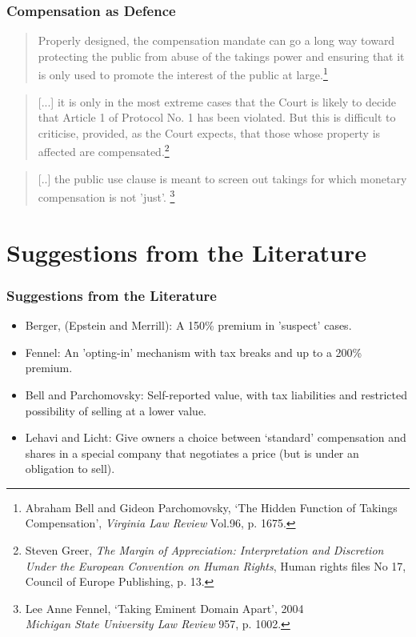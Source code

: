 \documentclass{beamer}
\begin{document}
\begin{frame}
\frametitle{Compensation as Defence}
\begin{center}
\begin{quote}\scriptsize Properly designed, the compensation mandate can go a long way toward protecting the public from abuse of the takings power and ensuring that it is only used to promote the interest of the public at large.\footnote{\tiny Abraham Bell and Gideon Parchomovsky, `The Hidden Function of Takings Compensation', {\it Virginia Law Review} Vol.96, p. 1675.} 
\end{quote}
\end{center}
\begin{center}
\begin{quote}
\scriptsize [...] it is
only in the most extreme cases that the Court is likely to decide that Article 1 of Protocol No. 1 has been violated. But this is difficult to criticise, provided, as the Court expects, that those whose property is
affected are compensated.\footnote{\tiny Steven Greer, {\it The Margin of Appreciation: Interpretation and Discretion Under the European Convention on Human Rights}, Human rights files No 17, Council of Europe Publishing, p. 13.}
\end{quote}
\end{center}

\begin{center}
\begin{quote}
\scriptsize [..] the public use clause is meant to screen out
takings for which monetary compensation is not 'just'.
\footnote{\tiny Lee Anne Fennel, `Taking Eminent Domain Apart', 2004 \\ {\it Michigan State University Law Review} 957, p. 1002.}\end{quote}
\end{center}
\end{frame}

\section{Suggestions from the Literature}
\begin{frame}\frametitle{Suggestions from the Literature}
\begin{itemize}
\item Berger, (Epstein and Merrill): A 150\% premium in 'suspect' cases.
\item Fennel: An 'opting-in' mechanism with tax breaks and up to a 200\% premium.
\item Bell and Parchomovsky: Self-reported value, with tax liabilities and restricted possibility of selling at a lower value.
\item Lehavi and Licht: Give owners a choice between `standard' compensation and shares in a special company that negotiates a price (but is under an obligation to sell).
\end{itemize}
\end{frame}
\end{document}
